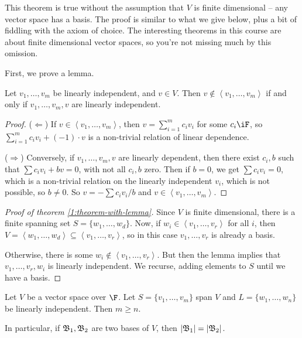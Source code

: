 \vspace{6pt}

\begin{remark}
	This theorem is true without the assumption that $V$ is finite dimensional -- any vector space has a basis. The proof is similar to what we give below, plus a bit of fiddling with the axiom of choice. The interesting theorems in this course are about finite dimensional vector spaces, so you're not missing much by this omission. %
\end{remark}
 
First, we prove a lemma.

\begin{lemma}
	Let $v_1,\ldots,v_m$ be linearly independent, and $v\in V$. Then $v\notin\left\langle v_1,\ldots,v_m \right\rangle$ if and only if $v_1,\ldots,v_m,v$ are linearly independent. \label{lem:lemma-proof-thm-2} %
\end{lemma}

\begin{proof}
	($\Leftarrow$) If $v\in\left\langle v_1,\ldots,v_m \right\rangle$, then $v=\sum_{i=1}^m c_i v_i$ for some $c_i\iF$, so $\sum_{i=1}^m c_i v_i + (-1)\cdot v$ is a non-trivial relation of linear dependence. %
	
	($\Rightarrow$) Conversely, if $v_1,\ldots,v_m,v$ are linearly dependent, then there exist $c_i,b$ such that $\sum c_i v_i + bv=0$, with not all $c_i,b$ zero. Then if $b=0$, we get $\sum c_i v_i=0$, which is a non-trivial relation on the linearly independent $v_i$, which is not possible, so $b\neq 0$. So $v=-\sum c_i v_i/b$ and $v\in\left\langle v_1,\ldots,v_m \right\rangle$. %
\end{proof}

\begin{proof}
	[Proof of theorem \ref{1:theorem-with-lemma}] Since $V$ is finite dimensional, there is a finite spanning set $S=\{w_1,\ldots,w_d\}$. Now, if $w_i \in \left\langle v_1,\ldots,v_r \right\rangle$ for all $i$, then $V=\left\langle w_1,\ldots,w_d \right\rangle\subseteq \left\langle v_1,\ldots,v_r \right\rangle$, so in this case $v_1,\ldots,v_r$ is already a basis. %
	
	Otherwise, there is some $w_i\not\in\left\langle v_1,\ldots,v_r \right\rangle$. But then the lemma implies that $v_1,\ldots,v_r,w_i$ is linearly independent.  We recurse, adding elements to $S$ until we have a basis.
\end{proof}

\begin{theorem}
	Let $V$ be a vector space over $\F$. Let $S=\{v_1,\ldots,v_m\}$ span $V$ and $L=\{w_1,\ldots,w_n\}$ be linearly independent. Then $m\geq n$. %
	
	In particular, if $\frak{B}_1,\frak{B}_2$ are two bases of $V$, then $\left\vert \frak{B}_1 \right\vert = \left\vert \frak{B}_2 \right\vert$. %
\end{theorem}

